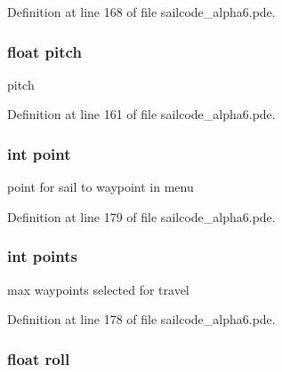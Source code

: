 \-Definition at line 168 of file sailcode\-\_\-alpha6.\-pde.

\hypertarget{group__group1_ga282e7d4378d4a18a805b8980295ac86c}{
\subsubsection[{pitch}]{\setlength{\rightskip}{0pt plus 5cm}float {\bf pitch}}}
\label{group__group1_ga282e7d4378d4a18a805b8980295ac86c}


pitch 



\-Definition at line 161 of file sailcode\-\_\-alpha6.\-pde.

\hypertarget{group__group1_ga2dee8b7fcecc7c2d190e9304b43ea886}{
\subsubsection[{point}]{\setlength{\rightskip}{0pt plus 5cm}int {\bf point}}}
\label{group__group1_ga2dee8b7fcecc7c2d190e9304b43ea886}


point for sail to waypoint in menu 



\-Definition at line 179 of file sailcode\-\_\-alpha6.\-pde.

\hypertarget{group__group1_gaf7f8f4a4e39e09fdb5e9f02330ecabef}{
\subsubsection[{points}]{\setlength{\rightskip}{0pt plus 5cm}int {\bf points}}}
\label{group__group1_gaf7f8f4a4e39e09fdb5e9f02330ecabef}


max waypoints selected for travel 



\-Definition at line 178 of file sailcode\-\_\-alpha6.\-pde.

\hypertarget{group__group1_ga26fd84d522945b6038221d9e38c7cc39}{
\subsubsection[{roll}]{\setlength{\rightskip}{0pt plus 5cm}float {\bf roll}}}
\label{group__group1_ga26fd84d522945b6038221d9e38c7cc39}


